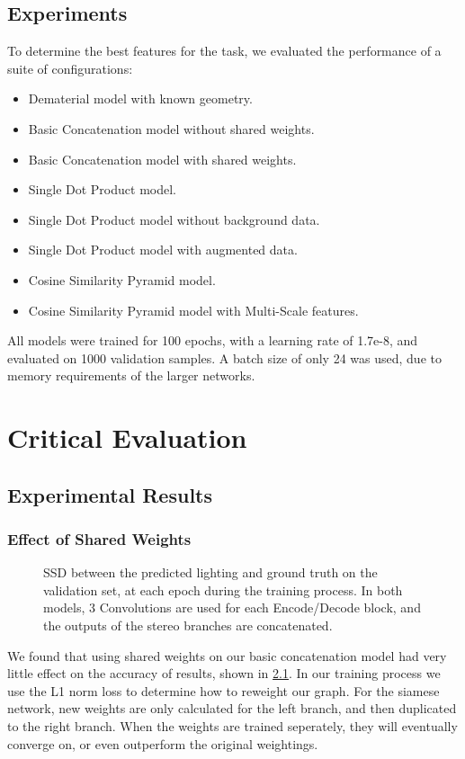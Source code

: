 \documentclass[ %
                    author={Gavin Parker},
                supervisor={Dr. Neill Campbell},
                    degree={MEng},
                     title={Deep Learning for Illumination Estimation from Stereo Images},
                  subtitle={},
                      type={Research},
                      year={2018} ]{dissertation}
\begin{document}
\section{Experiments}
To determine the best features for the task, we evaluated the performance of a suite of configurations:
\begin{itemize}
\item Dematerial model with known geometry.
\item Basic Concatenation model without shared weights.
\item Basic Concatenation model with shared weights.
\item Single Dot Product model.
\item Single Dot Product model without background data.
\item Single Dot Product model with augmented data.
\item Cosine Similarity Pyramid model.
\item Cosine Similarity Pyramid model with Multi-Scale features.
\end{itemize}
All models were trained for 100 epochs, with a learning rate of 1.7e-8, and evaluated on 1000 validation samples. A batch size of only 24 was used, due to memory requirements of the larger networks.
\chapter{Critical Evaluation}
\label{chap:evaluation}
\section{Experimental Results}
\subsection{Effect of Shared Weights}
\begin{figure}[H]
\newlength\figureheight
\newlength\figurewidth
\setlength\figureheight{6cm}
\setlength\figurewidth{12cm}
\centering

\caption{SSD between the predicted lighting and ground truth on the validation set, at each epoch during the training process. In both models, 3 Convolutions are used for each Encode/Decode block, and the outputs of the stereo branches are concatenated.}
\label{fig:siam_comp}

\end{figure}
We found that using shared weights on our basic concatenation model had very little effect on the accuracy of results, shown in \ref{fig:siam_comp}. In our training process we use the L1 norm loss to determine how to reweight our graph. For the siamese network, new weights are only calculated for the left branch, and then duplicated to the right branch. When the weights are trained seperately, they will eventually converge on, or even outperform the original weightings.
\end{document}

